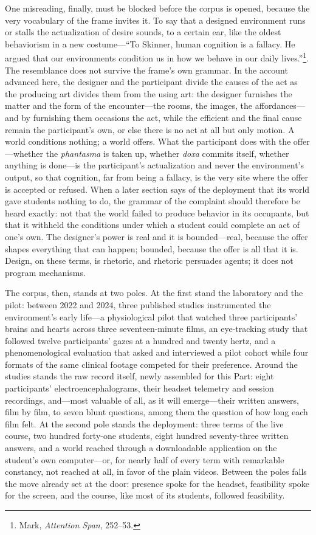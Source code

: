 \documentclass{article}
\begin{document}
One misreading, finally, must be blocked before the corpus is opened, because the very vocabulary of the frame invites it. To say that a designed environment runs or stalls the actualization of desire sounds, to a certain ear, like the oldest behaviorism in a new costume---``To Skinner, human cognition is a fallacy. He argued that our environments condition us in how we behave in our daily lives.''\footnote{Mark, \textit{Attention Span}, 252--53.}. The resemblance does not survive the frame's own grammar. In the account advanced here, the designer and the participant divide the causes of the act as the producing art divides them from the using art: the designer furnishes the matter and the form of the encounter---the rooms, the images, the affordances---and by furnishing them occasions the act, while the efficient and the final cause remain the participant's own, or else there is no act at all but only motion. A world conditions nothing; a world offers. What the participant does with the offer---whether the \textit{phantasma} is taken up, whether \textit{doxa} commits itself, whether anything is done---is the participant's actualization and never the environment's output, so that cognition, far from being a fallacy, is the very site where the offer is accepted or refused. When a later section says of the deployment that its world gave students nothing to do, the grammar of the complaint should therefore be heard exactly: not that the world failed to produce behavior in its occupants, but that it withheld the conditions under which a student could complete an act of one's own. The designer's power is real and it is bounded---real, because the offer shapes everything that can happen; bounded, because the offer is all that it is. Design, on these terms, is rhetoric, and rhetoric persuades agents; it does not program mechanisms.

The corpus, then, stands at two poles. At the first stand the laboratory and the pilot: between 2022 and 2024, three published studies instrumented the environment's early life---a physiological pilot that watched three participants' brains and hearts across three seventeen-minute films, an eye-tracking study that followed twelve participants' gazes at a hundred and twenty hertz, and a phenomenological evaluation that asked and interviewed a pilot cohort while four formats of the same clinical footage competed for their preference. Around the studies stands the raw record itself, newly assembled for this Part: eight participants' electroencephalograms, their headset telemetry and session recordings, and---most valuable of all, as it will emerge---their written answers, film by film, to seven blunt questions, among them the question of how long each film felt. At the second pole stands the deployment: three terms of the live course, two hundred forty-one students, eight hundred seventy-three written answers, and a world reached through a downloadable application on the student's own computer---or, for nearly half of every term with remarkable constancy, not reached at all, in favor of the plain videos. Between the poles falls the move already set at the door: presence spoke for the headset, feasibility spoke for the screen, and the course, like most of its students, followed feasibility.
\end{document}
